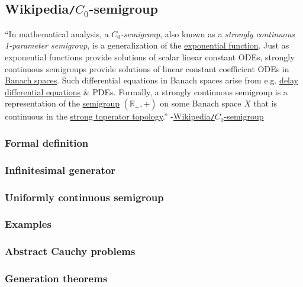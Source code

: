 \documentclass{article}
\begin{document}

\subsection{Wikipedia{\tt/}$C_0$-semigroup}
``In mathematical analysis, a {\it $C_0$-semigroup}, also known as a {\it strongly continuous 1-parameter semigroup}, is a generalization of the \href{https://en.wikipedia.org/wiki/Exponential_function}{exponential function}. Just as exponential functions provide solutions of scalar linear constant ODEs, strongly continuous semigroups provide solutions of linear constant coefficient ODEs in \href{https://en.wikipedia.org/wiki/Banach_space}{Banach spaces}. Such differential equations in Banach spaces arise from e.g. \href{https://en.wikipedia.org/wiki/Delay_differential_equation}{delay differential equations} \& PDEs. Formally, a strongly continuous semigroup is a representation of the \href{https://en.wikipedia.org/wiki/Semigroup}{semigroup} $(\mathbb{R}_+,+)$ on some Banach space $X$ that is continuous in the \href{https://en.wikipedia.org/wiki/Strong_operator_topology}{strong toperator topology}.'' -\href{https://en.wikipedia.org/wiki/C0-semigroup}{Wikipedia{\tt/}$C_0$-semigroup}

\subsubsection{Formal definition}

\subsubsection{Infinitesimal generator}

\subsubsection{Uniformly continuous semigroup}

\subsubsection{Examples}

\subsubsection{Abstract Cauchy problems}

\subsubsection{Generation theorems}
\end{document}

